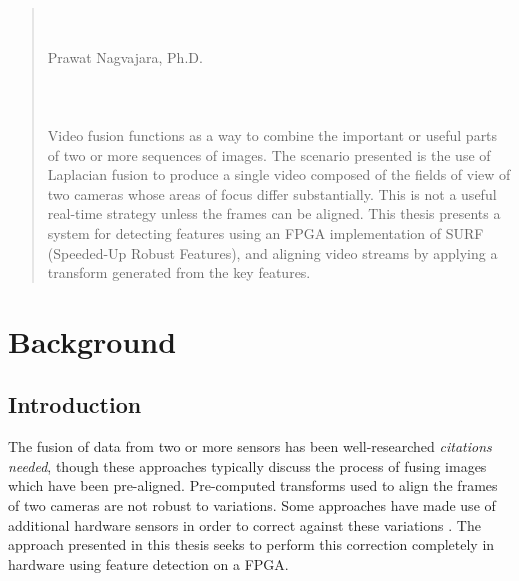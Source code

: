 \documentclass{article}
\begin{document}
\setcounter{page}{2}
\begin{center}
    \tableofcontents
    \clearpage
    
    \listoftables
    \clearpage
    
    \listoffigures
\end{center}
\clearpage

\hfill \\
\hfill \\
\hfill \\
\hfill \\


\begin{abstract}
    \singlespacing
    \centering
    \thetitle \\
    \theauthor \\
    Prawat Nagvajara, Ph.D. \\
    
    \hfill \\
    \hfill \\
    \hfill \\
    
    \doublespacing
    Video fusion functions as a way to combine the important or useful parts of two or more sequences of images. The scenario presented is the use of Laplacian fusion to produce a single video composed of the fields of view of two cameras whose areas of focus differ substantially. This is not a useful real-time strategy unless the frames can be aligned. This thesis presents a system for detecting features using an FPGA implementation of SURF (Speeded-Up Robust Features), and aligning video streams by applying a transform generated from the key features. 
\end{abstract}

\clearpage


\section{Background}

\subsection{Introduction}

The fusion of data from two or more sensors has been well-researched \textit{citations needed}, though these approaches typically discuss the process of fusing images which have been pre-aligned. Pre-computed transforms used to align the frames of two cameras are not robust to variations. Some approaches have made use of additional hardware sensors in order to correct against these variations \cite{chappell_exploiting_2006}. The approach presented in this thesis seeks to perform this correction completely in hardware using feature detection on a FPGA.
\end{document}
